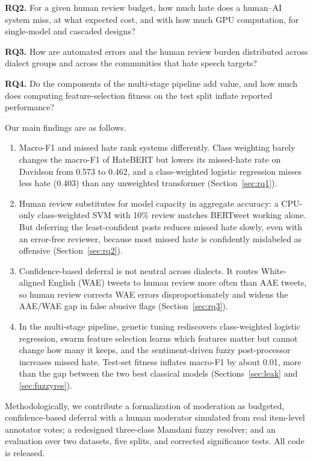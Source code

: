 \documentclass[lettersize,journal]{IEEEtran}
\begin{document}
\textbf{RQ2.} For a given human review budget, how much hate does a human--AI system miss, at what expected cost, and with how much GPU computation, for single-model and cascaded designs?

\textbf{RQ3.} How are automated errors and the human review burden distributed across dialect groups and across the communities that hate speech targets?

\textbf{RQ4.} Do the components of the multi-stage pipeline add value, and how much does computing feature-selection fitness on the test split inflate reported performance?

Our main findings are as follows.
\begin{enumerate}
\item Macro-F1 and missed hate rank systems differently. Class weighting barely changes the macro-F1 of HateBERT but lowers its missed-hate rate on Davidson from 0.573 to 0.462, and a class-weighted logistic regression misses less hate (0.403) than any unweighted transformer (Section~\ref{sec:rq1}).
\item Human review substitutes for model capacity in aggregate accuracy: a CPU-only class-weighted SVM with 10\% review matches BERTweet working alone. But deferring the least-confident posts reduces missed hate slowly, even with an error-free reviewer, because most missed hate is confidently mislabeled as offensive (Section~\ref{sec:rq2}).
\item Confidence-based deferral is not neutral across dialects. It routes White-aligned English (WAE) tweets to human review more often than AAE tweets, so human review corrects WAE errors disproportionately and widens the AAE/WAE gap in false abusive flags (Section~\ref{sec:rq3}).
\item In the multi-stage pipeline, genetic tuning rediscovers class-weighted logistic regression, swarm feature selection learns which features matter but cannot change how many it keeps, and the sentiment-driven fuzzy post-processor increases missed hate. Test-set fitness inflates macro-F1 by about 0.01, more than the gap between the two best classical models (Sections~\ref{sec:leak} and \ref{sec:fuzzyres}).
\end{enumerate}
Methodologically, we contribute a formalization of moderation as budgeted, confidence-based deferral with a human moderator simulated from real item-level annotator votes; a redesigned three-class Mamdani fuzzy resolver; and an evaluation over two datasets, five splits, and corrected significance tests. All code is released.
\end{document}
